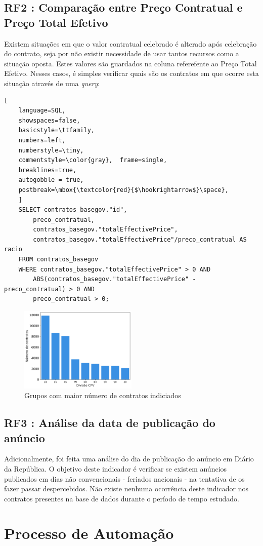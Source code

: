 \subsection{RF2 : Comparação entre Preço Contratual e Preço Total Efetivo}

Existem situações em que o valor contratual celebrado é alterado após celebração do contrato, seja por não existir necessidade de usar tantos recursos como a situação oposta. Estes valores são guardados na coluna referefente ao Preço Total Efetivo. Nesses casos, é simples verificar quais são os contratos em que ocorre esta situação através de uma \textit{query}: 

\begin{lstlisting}[
	language=SQL,
	showspaces=false,
	basicstyle=\ttfamily,
	numbers=left,
	numberstyle=\tiny,
	commentstyle=\color{gray},	frame=single,
	breaklines=true,
	autogobble = true,
	postbreak=\mbox{\textcolor{red}{$\hookrightarrow$}\space},
	]
	SELECT contratos_basegov."id", 
		preco_contratual, 
		contratos_basegov."totalEffectivePrice", 
		contratos_basegov."totalEffectivePrice"/preco_contratual AS racio
	FROM contratos_basegov 
	WHERE contratos_basegov."totalEffectivePrice" > 0 AND 
		ABS(contratos_basegov."totalEffectivePrice" - preco_contratual) > 0 AND 
		preco_contratual > 0;
\end{lstlisting}


\begin{figure}[H]
	\centering
	\includegraphics[width=0.5\textwidth]{imagens/rf2/main_cpvs.png}
	\caption{Grupos com maior número de contratos indiciados}
	\label{}
\end{figure}



\subsection{RF3 : Análise da data de publicação do anúncio}

Adicionalmente, foi feita uma análise do dia de publicação do anúncio em Diário da República. O objetivo deste indicador é verificar se existem anúncios publicados em dias não convencionais - feriados nacionais - na tentativa de os fazer passar despercebidos. Não existe nenhuma ocorrência deste indicador nos contratos presentes na base de dados durante o período de tempo estudado. 




\section{Processo de Automação}






